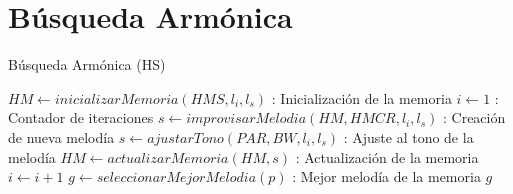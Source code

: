 \documentclass[10pt,letterpaper,twoside,openright]{article}
\begin{document}
		 \newpage
		 
	\section{Búsqueda Armónica}
	
		\begin{algorithm}[H]
			\caption{Búsqueda Armónica (HS)}
				$ HM \leftarrow inicializarMemoria(HMS,l_{i},l_{s})$ : Inicialización de la memoria\;
				$ i \leftarrow 1 $ : Contador de iteraciones\;
				{
					$s \leftarrow improvisarMelodia(HM, HMCR,l_{i},l_{s})$ : Creación de nueva melodía\;
					$s \leftarrow ajustarTono(PAR, BW,l_{i},l_{s})$ : Ajuste al tono de la melodía\;
					$HM \leftarrow actualizarMemoria(HM,s) $ : Actualización de la memoria\;
					$ i \leftarrow  i + 1 $\;
				}
				$ g \leftarrow seleccionarMejorMelodia(p) $ : Mejor melodía de la memoria\;
		 		\Return $ g $
		 \end{algorithm}
\end{document}
